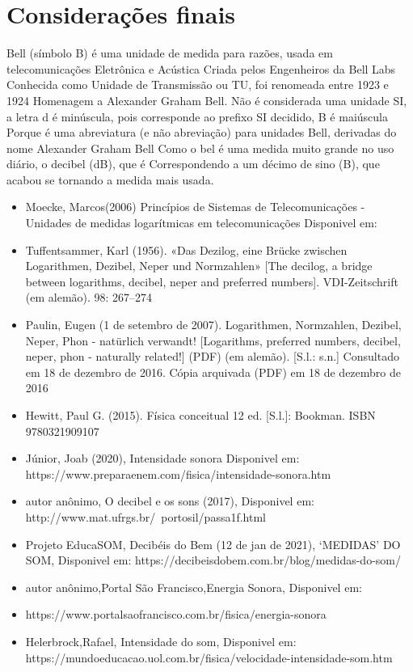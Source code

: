 \documentclass[
	article,			%
	11pt,				%
	oneside,			%
	a4paper,			%
	english,			%
	brazil,				%
	sumario=tradicional
	]{abntex2}
\begin{document}
\section{Considerações finais}
Bell (símbolo B) é uma unidade de medida para razões, usada em telecomunicações
Eletrônica e Acústica Criada pelos Engenheiros da Bell Labs
Conhecida como Unidade de Transmissão ou TU, foi renomeada entre 1923 e 1924
Homenagem a Alexander Graham Bell. Não é considerada uma unidade SI, a letra d é
minúscula, pois corresponde ao prefixo SI decidido, B é maiúscula
Porque é uma abreviatura (e não abreviação)  para unidades Bell, derivadas do nome Alexander
Graham Bell Como o bel é uma medida muito grande no uso diário, o decibel (dB), que é
Correspondendo a um décimo de sino (B), que acabou se tornando a medida mais usada.\newpage
\postextual


\begin{itemize}\smaller
    \item  Moecke, Marcos(2006) Princípios de Sistemas de Telecomunicações - Unidades de medidas logarítmicas em telecomunicações Disponivel em: 
    \item Tuffentsammer, Karl (1956). «Das Dezilog, eine Brücke zwischen Logarithmen, Dezibel, Neper und Normzahlen» [The decilog, a bridge between logarithms, decibel, neper and preferred numbers]. VDI-Zeitschrift (em alemão). 98: 267–274
    \item Paulin, Eugen (1 de setembro de 2007). Logarithmen, Normzahlen, Dezibel, Neper, Phon - natürlich verwandt! [Logarithms, preferred numbers, decibel, neper, phon - naturally related!] (PDF) (em alemão). [S.l.: s.n.] Consultado em 18 de dezembro de 2016. Cópia arquivada (PDF) em 18 de dezembro de 2016
    \item Hewitt, Paul G. (2015). Física conceitual 12 ed. [S.l.]: Bookman. ISBN 9780321909107
    \item Júnior, Joab (2020), Intensidade sonora Disponivel em: https://www.preparaenem.com/fisica/intensidade-sonora.htm
    \item autor anônimo, O decibel e os sons (2017), Disponivel em: http://www.mat.ufrgs.br/~portosil/passa1f.html
    \item Projeto EducaSOM, Decibéis do Bem (12 de jan de 2021), ‘MEDIDAS’ DO SOM, Disponivel em: https://decibeisdobem.com.br/blog/medidas-do-som/
    \item autor anônimo,Portal São Francisco,Energia Sonora, Disponivel em:
    \item https://www.portalsaofrancisco.com.br/fisica/energia-sonora
    \item Helerbrock,Rafael, Intensidade do som, Disponivel em: https://mundoeducacao.uol.com.br/fisica/velocidade-intensidade-som.htm
\end{itemize}
\end{document}

